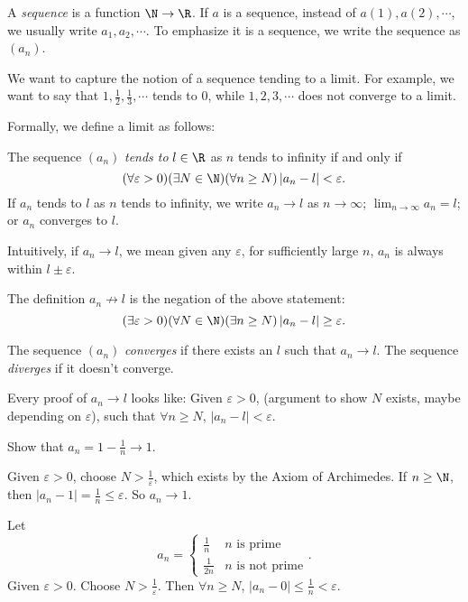 \documentclass[a4paper]{article}
\begin{document}
\begin{defi}[Sequence]
  A \emph{sequence} is a function $\N\to \R$. If $a$ is a sequence, instead of $a(1), a(2), \cdots$, we usually write $a_1, a_2, \cdots$. To emphasize it is a sequence, we write the sequence as $(a_n)$.
\end{defi}
We want to capture the notion of a sequence tending to a limit. For example, we want to say that $1, \frac{1}{2}, \frac{1}{3}, \cdots$ tends to $0$, while $1, 2, 3, \cdots$ does not converge to a limit.

Formally, we define a limit as follows:

\begin{defi}
  The sequence $(a_n)$ \emph{tends to} $l\in \R$ as $n$ tends to infinity if and only if
  \[
    (\forall \varepsilon > 0)(\exists N \in \N)(\forall n \geq N)\,|a_n - l| < \varepsilon.
  \]
  If $a_n$ tends to $l$ as $n$ tends to infinity, we write $a_n \to l$ as $n\to \infty$; $\displaystyle \lim_{n \to \infty} a_n = l$; or $a_n$ converges to $l$.
\end{defi}
Intuitively, if $a_n \to l$, we mean given any $\varepsilon$, for sufficiently large $n$, $a_n$ is always within $l\pm \varepsilon$.

The definition $a_n\not\to l$ is the negation of the above statement:
\[
  (\exists \varepsilon > 0)(\forall N\in \N)(\exists n\geq N)\,|a_n - l| \geq \varepsilon.
\]

\begin{defi}
  The sequence $(a_n)$ \emph{converges} if there exists an $l$ such that $a_n\to l$. The sequence \emph{diverges} if it doesn't converge.
\end{defi}

Every proof of $a_n \to l$ looks like: Given $\varepsilon > 0$, (argument to show $N$ exists, maybe depending on $\varepsilon$), such that $\forall n\geq N$, $|a_n - l| < \varepsilon$.
\begin{eg}
  Show that $a_n = 1 - \frac{1}{n} \to 1$.

  Given $\varepsilon > 0$, choose $N > \frac{1}{\varepsilon}$, which exists by the Axiom of Archimedes. If $n \geq \N$, then $|a_n - 1| = \frac{1}{n} \leq \varepsilon$. So $a_n\to 1$.
\end{eg}

\begin{eg}
  Let
  \[
    a_n = \begin{cases}\frac{1}{n} & n\text{ is prime}\\ \frac{1}{2n} & n\text{ is not prime}\end{cases}.
  \]
  Given $\varepsilon > 0$. Choose $N > \frac{1}{\varepsilon}$. Then $\forall n\geq N$, $|a_n - 0| \leq \frac{1}{n} < \varepsilon$.
\end{eg}
\end{document}
